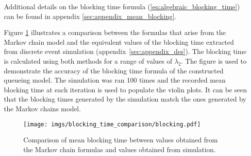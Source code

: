 Additional details on the blocking time formula 
(\ref{eq:algebraic_blocking_time}) can be found in appendix 
\ref{sec:appendix_mean_blocking}. 

Figure \ref{fig:markov_vs_des_blocking_time_comparison} illustrates a comparison 
between the formulas that arise from the Markov chain model and the equivalent 
values of the blocking time extracted from discrete event simulation
(appendix~\ref{sec:appendix_des}).
The blocking time is calculated using both methods for a range of values of
\(\lambda_2\).
The figure is used to demonstrate the accuracy of the blocking time formula of
the constructed queueing model.
The simulation was ran 100 times and the recorded mean blocking time at each 
iteration is used to populate the violin plots.
It can be seen that the blocking times generated by the simulation match the
ones generated by the Markov chains model.

\begin{figure}[H]
    \centering
    \texttt{[image: imgs/blocking\_time\_comparison/blocking.pdf]}
    \caption{
        Comparison of mean blocking time between values obtained from the 
        Markov chain formulas and values obtained from simulation.
    }
    \label{fig:markov_vs_des_blocking_time_comparison}
\end{figure}
